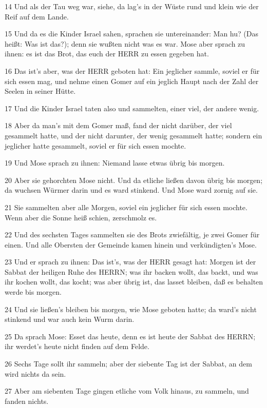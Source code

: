 \par 14 Und als der Tau weg war, siehe, da lag's in der Wüste rund und klein wie der Reif auf dem Lande.
\par 15 Und da es die Kinder Israel sahen, sprachen sie untereinander: Man hu? (Das heißt: Was ist das?); denn sie wußten nicht was es war. Mose aber sprach zu ihnen: es ist das Brot, das euch der HERR zu essen gegeben hat.
\par 16 Das ist's aber, was der HERR geboten hat: Ein jeglicher sammle, soviel er für sich essen mag, und nehme einen Gomer auf ein jeglich Haupt nach der Zahl der Seelen in seiner Hütte.
\par 17 Und die Kinder Israel taten also und sammelten, einer viel, der andere wenig.
\par 18 Aber da man's mit dem Gomer maß, fand der nicht darüber, der viel gesammelt hatte, und der nicht darunter, der wenig gesammelt hatte; sondern ein jeglicher hatte gesammelt, soviel er für sich essen mochte.
\par 19 Und Mose sprach zu ihnen: Niemand lasse etwas übrig bis morgen.
\par 20 Aber sie gehorchten Mose nicht. Und da etliche ließen davon übrig bis morgen; da wuchsen Würmer darin und es ward stinkend. Und Mose ward zornig auf sie.
\par 21 Sie sammelten aber alle Morgen, soviel ein jeglicher für sich essen mochte. Wenn aber die Sonne heiß schien, zerschmolz es.
\par 22 Und des sechsten Tages sammelten sie des Brots zwiefältig, je zwei Gomer für einen. Und alle Obersten der Gemeinde kamen hinein und verkündigten's Mose.
\par 23 Und er sprach zu ihnen: Das ist's, was der HERR gesagt hat: Morgen ist der Sabbat der heiligen Ruhe des HERRN; was ihr backen wollt, das backt, und was ihr kochen wollt, das kocht; was aber übrig ist, das lasset bleiben, daß es behalten werde bis morgen.
\par 24 Und sie ließen's bleiben bis morgen, wie Mose geboten hatte; da ward's nicht stinkend und war auch kein Wurm darin.
\par 25 Da sprach Mose: Esset das heute, denn es ist heute der Sabbat des HERRN; ihr werdet's heute nicht finden auf dem Felde.
\par 26 Sechs Tage sollt ihr sammeln; aber der siebente Tag ist der Sabbat, an dem wird nichts da sein.
\par 27 Aber am siebenten Tage gingen etliche vom Volk hinaus, zu sammeln, und fanden nichts.
